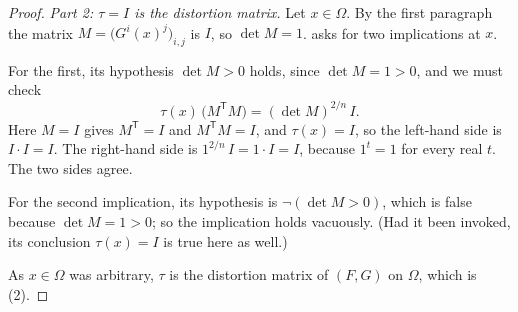 \begin{proof}
\emph{Part 2: $\tau=I$ is the distortion matrix.}  Let $x\in\Omega$.  By the
first paragraph the matrix $M=\bigl(G^i(x)^j\bigr)_{i,j}$ is $I$, so
$\det M=1$.   asks for two implications at $x$.

For the first, its hypothesis $\det M>0$ holds, since $\det M=1>0$, and we must
check
\[
\tau(x)\,\bigl(M^{\mathsf T}M\bigr)=(\det M)^{2/n}\,I .
\]
Here $M=I$ gives $M^{\mathsf T}=I$ and $M^{\mathsf T}M=I$, and $\tau(x)=I$, so
the left-hand side is $I\cdot I=I$.  The right-hand side is
$1^{2/n}\,I=1\cdot I=I$, because $1^t=1$ for every real $t$.  The two sides agree.

For the second implication, its hypothesis is $\neg(\det M>0)$, which is false
because $\det M=1>0$; so the implication holds vacuously.  (Had it been invoked,
its conclusion $\tau(x)=I$ is true here as well.)

As $x\in\Omega$ was arbitrary, $\tau$ is the distortion matrix of $(F,G)$ on
$\Omega$, which is (2).
\end{proof}
